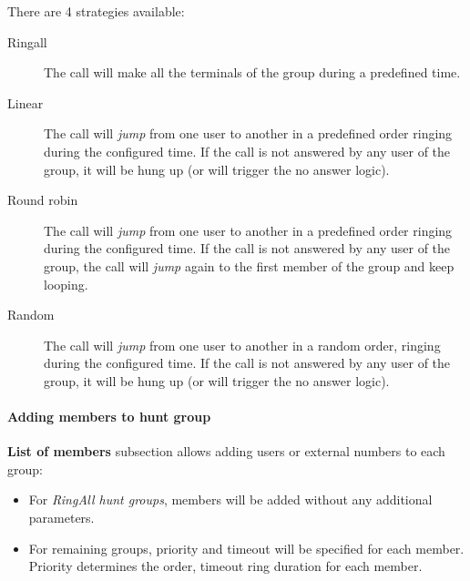 \documentclass[letterpaper,10pt,english]{sphinxmanual}
\begin{document}
There are 4 strategies available:
\begin{description}
\item[{Ringall}] \leavevmode{}\label{administration_portal/client/vpbx/routing_endpoints/hunt_groups:term-ringall}
The call will make all the terminals of the group during a predefined
time.

\item[{Linear}] \leavevmode{}\label{administration_portal/client/vpbx/routing_endpoints/hunt_groups:term-linear}
The call will \emph{jump} from one user to another in a predefined order
ringing during the configured time. If the call is not answered by any
user of the group, it will be hung up (or will trigger the no answer logic).

\item[{Round robin}] \leavevmode{}\label{administration_portal/client/vpbx/routing_endpoints/hunt_groups:term-round-robin}
The call will \emph{jump} from one user to another in a predefined order
ringing during the configured time. If the call is not answered by any
user of the group, the call will \emph{jump} again to the first member of the
group and keep looping.

\item[{Random}] \leavevmode{}\label{administration_portal/client/vpbx/routing_endpoints/hunt_groups:term-random}
The call will \emph{jump} from one user to another in a random order,
ringing during the configured time.  If the call is not answered by any
user of the group, it will be hung up (or will trigger the no answer logic).

\end{description}


\paragraph{Adding members to hunt group}
\label{administration_portal/client/vpbx/routing_endpoints/hunt_groups:adding-members-to-hunt-group}
\textbf{List of members} subsection allows adding users or external numbers to each group:
\begin{itemize}
\item {} 
For \emph{RingAll hunt groups}, members will be added without any additional parameters.

\item {} 
For remaining groups, priority and timeout will be specified for each member. Priority determines the order, timeout ring
duration for each member.

\end{itemize}
\end{document}
